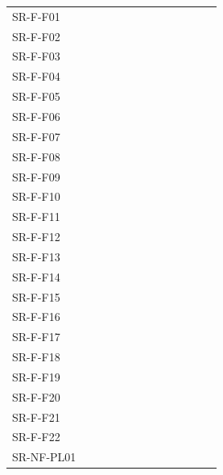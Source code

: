 \begin{table}[htb]
  \centering
  \begin{tabular}{@{}L{3cm}C{0.7cm}C{0.7cm}C{0.7cm}C{0.7cm}C{0.7cm}C{0.7cm}C{0.7cm}C{0.7cm}C{0.7cm}C{0.7cm}C{0.7cm}C{0.7cm}@{}}
    \toprule
      &  &  &  &  &  &  &  &  &  &  &  & \\
    \midrule
    SR-F-F01 & & & & & &  & & & & & & \\
    SR-F-F02 & & & & & &  & & & & & & \\
    SR-F-F03 & & & & & &  & & & & & & \\
    SR-F-F04 & & & & & & &  & & & & & \\
    SR-F-F05 & & & & & & &  & & & & & \\
    SR-F-F06 & & & & & & & &  &  & & & \\
    SR-F-F07 & & & & & & & &  & & & & \\
    SR-F-F08 & & & & & & & &  & & & & \\
    SR-F-F09 & & & & & & &  & & & & & \\
    SR-F-F10 & & & & & & &  & & & & & \\
    SR-F-F11 & & & & & & &  & & & & & \\
    SR-F-F12 & & & & & & & & &  & & & \\
    SR-F-F13 & & & & & & & &  & & & & \\
    SR-F-F14 & & & & & & & &  & & & & \\
    SR-F-F15 & & & & & & &  & & & & & \\
     SR-F-F16 & & & & & & & & & &  & & \\
    SR-F-F17 & & & & & & & & & &  & & \\
    SR-F-F18 & & & & & & & & & &  & & \\
    SR-F-F19 & & & & & & & & & & &  & \\
    SR-F-F20 & & & & & & & & & & & &  \\
    SR-F-F21 & & & & & & & & & & & &  \\
    SR-F-F22 & & & & & & & & & &  & &  \\
    SR-NF-PL01 &  & & & & & & & & & & & \\

\end{tabular}
\end{table}
